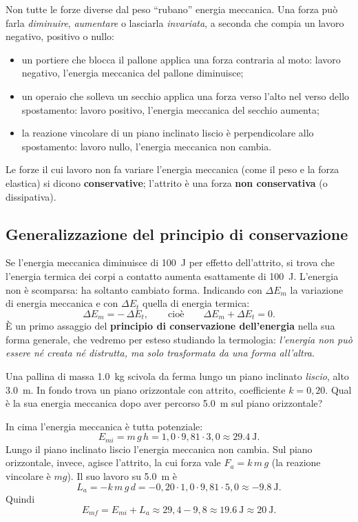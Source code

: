 \begin{remark}
Non tutte le forze diverse dal peso ``rubano'' energia meccanica. Una forza può farla \emph{diminuire}, \emph{aumentare} o lasciarla \emph{invariata}, a seconda che compia un lavoro negativo, positivo o nullo:
\begin{itemize}
    \item un portiere che blocca il pallone applica una forza contraria al moto: lavoro negativo, l'energia meccanica del pallone diminuisce;
    \item un operaio che solleva un secchio applica una forza verso l'alto nel verso dello spostamento: lavoro positivo, l'energia meccanica del secchio aumenta;
    \item la reazione vincolare di un piano inclinato liscio è perpendicolare allo spostamento: lavoro nullo, l'energia meccanica non cambia.
\end{itemize}
Le forze il cui lavoro non fa variare l'energia meccanica (come il peso e la forza elastica) si dicono \textbf{conservative}; l'attrito è una forza \textbf{non conservativa} (o dissipativa).
\end{remark}

\subsection{Generalizzazione del principio di conservazione}
Se l'energia meccanica diminuisce di \SI{100}{\joule} per effetto dell'attrito, si trova che l'energia termica dei corpi a contatto aumenta esattamente di \SI{100}{\joule}. L'energia non è scomparsa: ha soltanto cambiato forma. Indicando con $\Delta E_m$ la variazione di energia meccanica e con $\Delta E_t$ quella di energia termica:
\[ \Delta E_m = -\,\Delta E_t, \qquad \text{cioè}\qquad \Delta E_m + \Delta E_t = 0. \]
È un primo assaggio del \textbf{principio di conservazione dell'energia} nella sua forma generale, che vedremo per esteso studiando la termologia: \emph{l'energia non può essere né creata né distrutta, ma solo trasformata da una forma all'altra}.

\begin{testexample}
Una pallina di massa \SI{1,0}{\kilo\gram} scivola da ferma lungo un piano inclinato \emph{liscio}, alto \SI{3,0}{\metre}. In fondo trova un piano orizzontale con attrito, coefficiente $k = 0{,}20$. Qual è la sua energia meccanica dopo aver percorso \SI{5,0}{\metre} sul piano orizzontale?

In cima l'energia meccanica è tutta potenziale:
\[ E_{mi} = m\,g\,h = 1{,}0 \cdot 9{,}81 \cdot 3{,}0 \approx \SI{29,4}{\joule}. \]
Lungo il piano inclinato liscio l'energia meccanica non cambia. Sul piano orizzontale, invece, agisce l'attrito, la cui forza vale $F_a = k\,m\,g$ (la reazione vincolare è $m g$). Il suo lavoro su \SI{5,0}{\metre} è
\[ L_a = -k\,m\,g\,d = -0{,}20 \cdot 1{,}0 \cdot 9{,}81 \cdot 5{,}0 \approx \SI{-9,8}{\joule}. \]
Quindi
\[ E_{mf} = E_{mi} + L_a \approx 29{,}4 - 9{,}8 \approx \SI{19,6}{\joule} \approx \SI{20}{\joule}. \]
\end{testexample}

